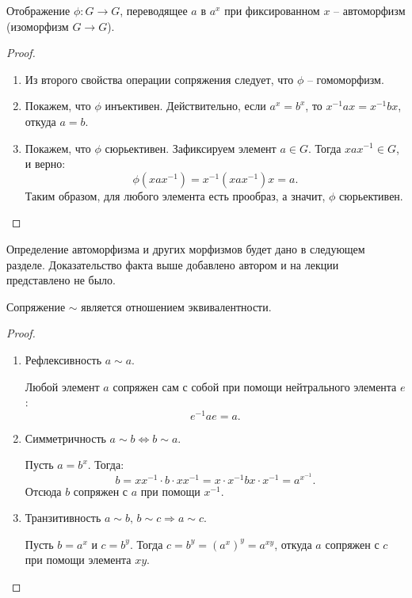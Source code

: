 \begin{note}
    Отображение $\phi: G \rightarrow G$, переводящее  $a$ в $a^x$ при фиксированном $x$ -- автоморфизм
    (изоморфизм $G \to G$).
\end{note}

\begin{proof}~
    \begin{enumerate}
        \item Из второго свойства операции сопряжения следует, что $\phi$ -- гомоморфизм. 
        \item Покажем, что $\phi$ инъективен. Действительно, если $a^x = b^x$, то $x^{-1}ax = x^{-1}bx$, 
        откуда $a = b$.
        \item Покажем, что $\phi$ сюрьективен. Зафиксируем элемент $a \in G$. Тогда $x a x^{-1} \in G$, 
        и верно: $$\phi(x a x^{-1}) = x^{-1} (x a x^{-1}) x = a.$$ Таким образом, для любого элемента есть прообраз, 
        а значит, $\phi$ сюрьективен.
    \end{enumerate}
\end{proof}

\begin{remarkfrom}
    Определение автоморфизма и других морфизмов будет дано в следующем разделе. Доказательство 
    факта выше добавлено автором и на лекции представлено не было.
\end{remarkfrom}

\begin{note}
    Сопряжение $\sim$ является отношением эквивалентности.
\end{note}

\begin{proof}~
    \begin{enumerate}
        \item Рефлексивность $a \sim a$.
        
        Любой элемент $a$ сопряжен сам с собой при помощи нейтрального элемента $e$: 
        $$e^{-1} a e = a.$$
        \item Симметричность $a \sim b \iff b \sim a$.
        
        Пусть $a = b^x$. Тогда: 
        $$b = x x^{-1} \cdot b \cdot x x^{-1} = x \cdot x^{-1} b x \cdot x^{-1} = a^{x^{-1}}.$$ 
        Отсюда $b$ сопряжен с $a$ при помощи $x^{-1}$.
        \item Транзитивность $a \sim b,\, b \sim c \Rightarrow a \sim c$.
        
        Пусть $b = a^x$ и $c = b^y$. Тогда $c = b^y = (a^x)^y = a^{xy}$, откуда $a$ сопряжен с $c$
        при помощи элемента $xy$.
    \end{enumerate}
\end{proof}

